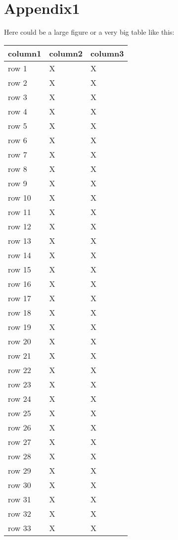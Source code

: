 
\chapter{Appendix1}
\label{app:a}

Here could be a large figure or a very big table like this:

\begin{tabularx}{\textwidth}{| p{} | p{} | p{} |}%
  \caption{Table caption} \\\endfirsthead
	
  \hline
  \textbf{column1} & column2 & column3 \\ \hline
  row 1 & X & X \\ \hline
	row 2 & X & X \\ \hline
	row 3 & X & X \\ \hline
	row 4 & X & X \\ \hline
	row 5 & X & X \\ \hline
	row 6 & X & X \\ \hline
	row 7 & X & X \\ \hline
	row 8 & X & X \\ \hline
	row 9 & X & X \\ \hline
	row 10 & X & X \\ \hline
	row 11 & X & X \\ \hline
	row 12& X & X \\ \hline
	row 13 & X & X \\ \hline
	row 14 & X & X \\ \hline
	row 15 & X & X \\ \hline
	row 16 & X & X \\ \hline
	row 17 & X & X \\ \hline
	row 18 & X & X \\ \hline
	row 19 & X & X \\ \hline
	row 20 & X & X \\ \hline
	row 21 & X & X \\ \hline
	row 22 & X & X \\ \hline
	row 23 & X & X \\ \hline
	row 24 & X & X \\ \hline
	row 25 & X & X \\ \hline
	row 26 & X & X \\ \hline
	row 27 & X & X \\ \hline
	row 28 & X & X \\ \hline
	row 29 & X & X \\ \hline
	row 30 & X & X \\ \hline
	row 31 & X & X \\ \hline
	row 32 & X & X \\ \hline
	row 33 & X & X \\ \hline
 \end{tabularx}


